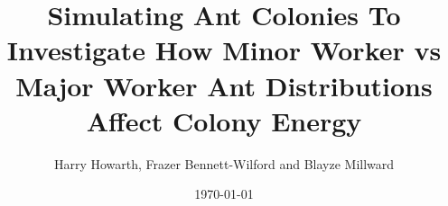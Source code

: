 \documentclass[11pt,oneside,titlepage]{article}
\title{Simulating Ant Colonies To Investigate How Minor Worker vs Major Worker Ant Distributions Affect Colony Energy}
\author{Harry Howarth, Frazer Bennett-Wilford and Blayze Millward}
\date{\today}
\begin{document}
  \maketitle
  
  \tableofcontents
  \newpage
  \listoffigures
  \listoftables
  
  
  
  
  
  
  
  
  
  
  \newpage
  
  

  \newpage
  \begin{appendix}
   
    
    
    
  \end{appendix}
  
\end{document}
